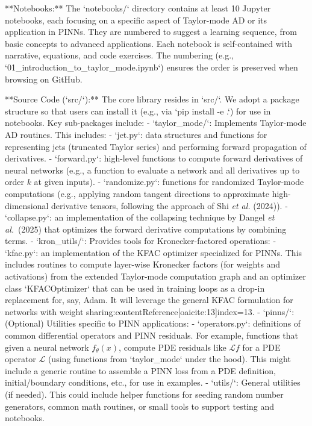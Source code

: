 \documentclass[11pt]{article}
\begin{document}
**Notebooks:** The `notebooks/` directory contains at least 10 Jupyter notebooks, each focusing on a specific aspect of Taylor-mode AD or its application in PINNs. They are numbered to suggest a learning sequence, from basic concepts to advanced applications. Each notebook is self-contained with narrative, equations, and code exercises. The numbering (e.g., `01_introduction_to_taylor_mode.ipynb`) ensures the order is preserved when browsing on GitHub.

**Source Code (`src/`):** The core library resides in `src/`. We adopt a package structure so that users can install it (e.g., via `pip install -e .`) for use in notebooks. Key sub-packages include:
- `taylor_mode/`: Implements Taylor-mode AD routines. This includes:
  - `jet.py`: data structures and functions for representing jets (truncated Taylor series) and performing forward propagation of derivatives.
  - `forward.py`: high-level functions to compute forward derivatives of neural networks (e.g., a function to evaluate a network and all derivatives up to order $k$ at given inputs).
  - `randomize.py`: functions for randomized Taylor-mode computations (e.g., applying random tangent directions to approximate high-dimensional derivative tensors, following the approach of Shi \textit{et al.} (2024)).
  - `collapse.py`: an implementation of the collapsing technique by Dangel \textit{et al.}\ (2025) that optimizes the forward derivative computations by combining terms.
- `kron_utils/`: Provides tools for Kronecker-factored operations:
  - `kfac.py`: an implementation of the KFAC optimizer specialized for PINNs. This includes routines to compute layer-wise Kronecker factors (for weights and activations) from the extended Taylor-mode computation graph and an optimizer class `KFACOptimizer` that can be used in training loops as a drop-in replacement for, say, Adam. It will leverage the general KFAC formulation for networks with weight sharing:contentReference[oaicite:13]{index=13}.
- `pinns/`: (Optional) Utilities specific to PINN applications:
  - `operators.py`: definitions of common differential operators and PINN residuals. For example, functions that given a neural network $f_\theta(x)$, compute PDE residuals like $\mathcal{L}f$ for a PDE operator $\mathcal{L}$ (using functions from `taylor_mode` under the hood). This might include a generic routine to assemble a PINN loss from a PDE definition, initial/boundary conditions, etc., for use in examples.
- `utils/`: General utilities (if needed). This could include helper functions for seeding random number generators, common math routines, or small tools to support testing and notebooks.
\end{document}
